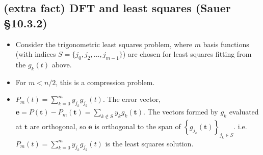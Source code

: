 \documentclass[12pt,letterpaper,noanswers]{exam}
\newcommand{\vc}[1]{\boldsymbol{#1}}
\begin{document}
\subsection*{(extra fact) DFT and least squares (Sauer \S 10.3.2)}
\begin{tcolorbox}
\begin{itemize}
\itemsep0pt
    \item Consider the trigonometric least squares problem, where $m$ basis functions (with indices $S = \{j_0,j_2,...,j_{m-1}\}$) are chosen for least squares fitting from the $g_k(t)$ above.
    \item For $m<n/2$, this is a compression problem.
    \item $P_m(t) = \sum\limits_{k=0}^m y_{j_k}g_{j_k}(t)$.  The error vector, $\vc{e} = P(\vc{t}) - P_m(\vc{t}) = \sum\limits_{k\notin S}y_k g_k(\vc{t})$.  The vectors formed by $g_k$ evaluated at $\vc{t}$ are orthogonal, so $\vc{e}$ is orthogonal to the span of $\left\{g_{j_k}(\vc{t})\right\}_{j_k\in S}$.  i.e. $P_m(t) = \sum\limits_{k=0}^m y_{j_k}g_{j_k}(t)$ is the least squares solution.
\end{itemize}
\end{tcolorbox}
\end{document}
